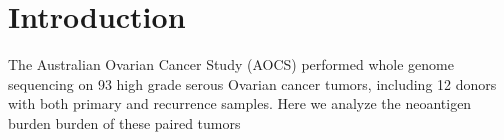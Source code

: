 \section*{Introduction}

The Australian Ovarian Cancer Study (AOCS)\cite{Patch_2015} performed whole genome sequencing on 93 high grade serous Ovarian cancer tumors, including 12 donors with both primary and recurrence samples. Here we analyze the neoantigen burden burden of these paired tumors 